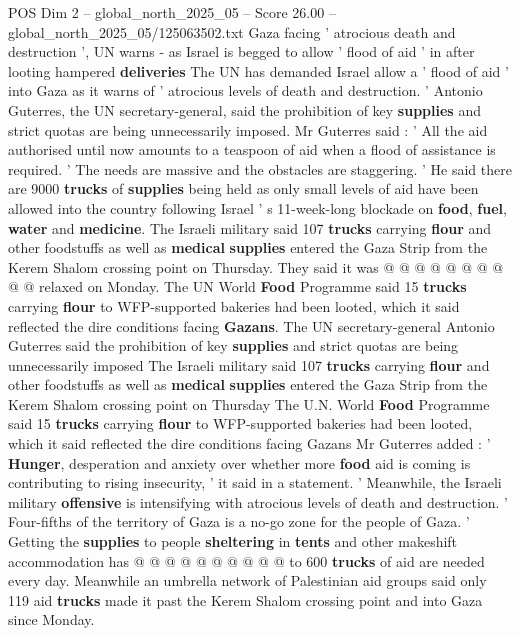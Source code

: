 \begin{textsample}{POS Dim 2 – global\_north\_2025\_05 – Score 26.00 – global\_north\_2025\_05/125063502.txt}  \label{ex:f2_pos_217}
Gaza facing ' atrocious death and destruction ', UN warns - as Israel is begged to allow ' flood of aid ' in after looting hampered \textbf{deliveries} The UN has demanded Israel allow a ' flood of aid ' into Gaza as it warns of ' atrocious levels of death and destruction. ' Antonio Guterres, the UN secretary-general, said the prohibition of key \textbf{supplies} and strict quotas are being unnecessarily imposed.
Mr Guterres said : ' All the aid authorised until now amounts to a teaspoon of aid when a flood of assistance is required. ' The needs are massive and the obstacles are staggering. ' He said there are 9000 \textbf{trucks} of \textbf{supplies} being held as only small levels of aid have been allowed into the country following Israel ' s 11-week-long blockade on \textbf{food}, \textbf{fuel}, \textbf{water} and \textbf{medicine}.
The Israeli military said 107 \textbf{trucks} carrying \textbf{flour} and other foodstuffs as well as \textbf{medical} \textbf{supplies} entered the Gaza Strip from the Kerem Shalom crossing point on Thursday.
They said it was @ @ @ @ @ @ @ @ @ @ relaxed on Monday.
The UN World \textbf{Food} Programme said 15 \textbf{trucks} carrying \textbf{flour} to WFP-supported bakeries had been looted, which it said reflected the dire conditions facing \textbf{Gazans}.
The UN secretary-general Antonio Guterres said the prohibition of key \textbf{supplies} and strict quotas are being unnecessarily imposed The Israeli military said 107 \textbf{trucks} carrying \textbf{flour} and other foodstuffs as well as \textbf{medical} \textbf{supplies} entered the Gaza Strip from the Kerem Shalom crossing point on Thursday The U.N.
World \textbf{Food} Programme said 15 \textbf{trucks} carrying \textbf{flour} to WFP-supported bakeries had been looted, which it said reflected the dire conditions facing Gazans Mr Guterres added : ' \textbf{Hunger}, desperation and anxiety over whether more \textbf{food} aid is coming is contributing to rising insecurity, ' it said in a statement. ' Meanwhile, the Israeli military \textbf{offensive} is intensifying with atrocious levels of death and destruction. ' Four-fifths of the territory of Gaza is a no-go zone for the people of Gaza. ' Getting the \textbf{supplies} to people \textbf{sheltering} in \textbf{tents} and other makeshift accommodation has @ @ @ @ @ @ @ @ @ @ to 600 \textbf{trucks} of aid are needed every day.
Meanwhile an umbrella network of Palestinian aid groups said only 119 aid \textbf{trucks} made it past the Kerem Shalom crossing point and into Gaza since Monday.

\end{textsample}
